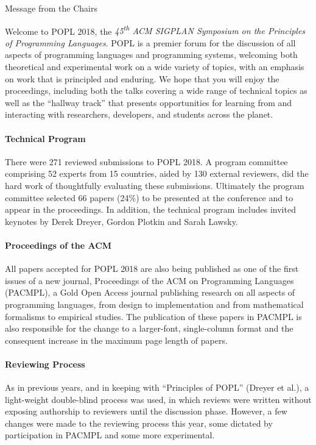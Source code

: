 \documentclass[11pt]{article}
\begin{document}
\begin{center}
\Large Message from the Chairs
\end{center}


\newcommand\person[1]{{#1}}

\noindent

Welcome to POPL 2018, the
\emph{45\textsuperscript{th} ACM SIGPLAN Symposium
on the Principles of Programming Languages}.
%
POPL is a premier forum for the discussion of all aspects
of programming languages and programming systems, welcoming
both theoretical and experimental work on a wide variety of
topics, with an emphasis on work that is principled and enduring.
%
We hope that you will enjoy the proceedings,
including both the talks covering a wide range
of technical topics as well as the ``hallway track''
that presents opportunities for learning from
and interacting with researchers, developers,
and students across the planet.


\paragraph{Technical Program}
%
There were 271 reviewed submissions to POPL 2018.
%
A program committee comprising 52 experts from 15 countries,
aided by 130 external reviewers, did the hard work of
thoughtfully evaluating these submissions.
%
Ultimately the program committee selected 66 papers (24\%)
to be presented at the conference and to appear in the
proceedings.
%
In addition, the technical program includes invited keynotes
by Derek Dreyer, Gordon Plotkin and Sarah Lawsky.

\paragraph{Proceedings of the ACM}
%
All papers accepted for POPL 2018 are also being published as one
of the first issues of a new journal, Proceedings of the ACM on
Programming Languages (PACMPL), a Gold Open Access journal publishing
research on all aspects of programming languages, from design to
implementation and from mathematical formalisms to empirical studies.
The publication of these papers in PACMPL is also responsible for
the change to a larger-font, single-column format and the consequent
increase in the maximum page length of papers.

\paragraph{Reviewing Process}
%
As in previous years, and in keeping with ``Principles of POPL'' (Dreyer et
al.), a light-weight double-blind process was used, in which reviews were
written without exposing authorship to reviewers until the discussion phase.
However, a few changes were made to the reviewing process this year,
some dictated by participation in PACMPL and some more experimental.
\end{document}
